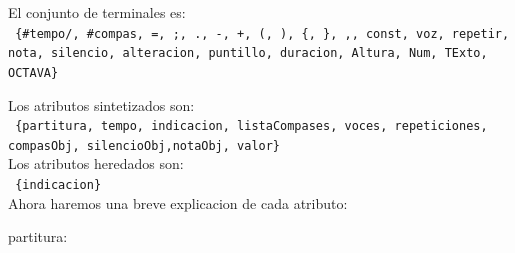 \documentclass[a4paper]{article}
\begin{document}
El conjunto de terminales es: \\
\texttt{
\{\#tempo/, \#compas, =, ;, ., -, +, (, ), \{, \}, ,,  const, voz, repetir, nota, silencio,  alteracion, puntillo, duracion, Altura, Num, TExto, OCTAVA\}
}\linebreak

Los atributos sintetizados son:\\
\texttt{
\{partitura, tempo, indicacion, listaCompases, voces, repeticiones, compasObj, silencioObj,notaObj, valor\}
}\\  


Los atributos heredados son: \\
\texttt{
\{indicacion\}
}\\  

Ahora haremos una breve explicacion de cada atributo:

partitura:
\end{document}

